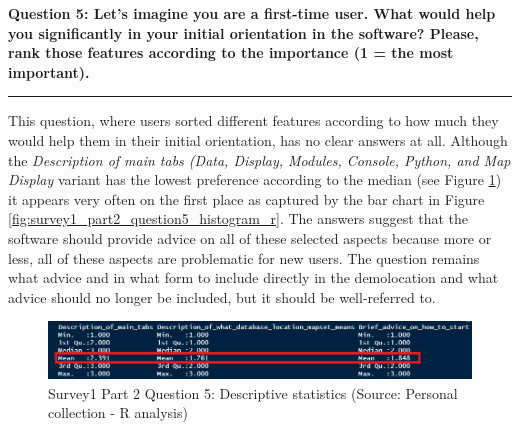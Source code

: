 \documentclass[a4paper,10pt,twoside]{article}
\begin{document}
\newpage
\noindent \textbf{Question 5: Let's imagine you are a first-time
  user. What would help you significantly in your initial orientation
  in the software? Please, rank those features according to the
  importance (1 = the most important).}
\par\noindent\rule{\textwidth}{0.4pt}

\noindent This question, where users sorted different features
according to how much they would help them in their initial
orientation, has no clear answers at all. Although the
\textit{Description of main tabs (Data, Display, Modules, Console,
  Python, and Map Display} variant has the lowest preference according
to the median (see Figure \ref{fig:survey1_part2_question5_stats}) it
appears very often on the first place as captured by the bar chart in
Figure \ref{fig:survey1_part2_question5_histogram_r}. The answers
suggest that the software should provide advice on all of these
selected aspects because more or less, all of these aspects are
problematic for new users. The question remains what advice and in
what form to include directly in the demolocation and what advice
should no longer be included, but it should be well-referred to.
    
\vspace{0.3cm}
\begin{figure}[hbt!] 
\begin{center}
\includegraphics[width=16cm]{../surveys/analyzed_data/survey1_part2_question5_stats.png} 
\caption[Survey1 Part 2 Question 5: Descriptive statistics]{Survey1 Part 2 Question 5: Descriptive statistics (Source: Personal collection - R analysis)}
\label{fig:survey1_part2_question5_stats}
\end{center}
\end{figure}
\end{document}
